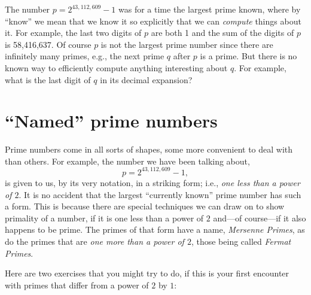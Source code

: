 \documentclass[openany]{book}
\theoremstyle{plain}
\theoremstyle{definition}
\begin{document}
The number $p= 2^{43,112,609} - 1$  was for a time
the largest prime known, where by
``know'' we mean that we know it so explicitly that we can {\em
  compute} things about it.  For example, the last two digits of $p$
are both 1 and the sum of the digits of $p$ is 58,416,637.\label{sumdigits}  Of course $p$ is not
the largest prime number since there are infinitely many primes, e.g.,
the next prime $q$ after $p$ is a prime.  But there is no known way
to efficiently compute anything interesting about $q$.  For example,
what is the last digit of $q$ in its decimal expansion?


\chapter{``Named'' prime numbers}\label{ch:namedprimes}
Prime numbers come in all sorts of shapes, some more convenient to
deal with than others.  For example, the number we have been talking
about, $$p = 2^{43,112,609}-1,$$ is given to us, by its very notation,
in a striking form; i.e., {\it one less than a power of $2$}. It is no
accident that the largest ``currently known'' prime number has such a
form.  This is because there are special techniques we can draw on to
show primality of a number, if it is one less than a power of $2$
and---of course---if it also happens to be prime.  The primes of that
form have a name, {\it Mersenne Primes}, as do the primes that are
{\it one more than a power of $2$}, those being called {\it Fermat
  Primes}.

Here are two exercises that you might try to do, if this is your first
encounter with primes that differ from a power of $2$ by $1$:
\end{document}
